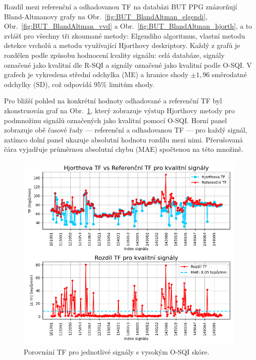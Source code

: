 Rozdíl mezi referenční a odhadovanou \acs{TF} na databázi \acs{BUT PPG} znázorňují Bland-Altmanovy grafy na Obr.~\ref{fig:BUT_BlandAltman_elgendi}, Obr.~\ref{fig:BUT_BlandAltman_vvd} a Obr.~\ref{fig:BUT_BlandAltman_hjorth}, a to zvlášť pro všechny tři zkoumané metody: Elgendiho algoritmus, vlastní metodu detekce vrcholů a metodu využívající Hjorthovy deskriptory.
Každý z grafů je rozdělen podle způsobu hodnocení kvality signálu: celá databáze, signály označené jako kvalitní dle \acs{R-SQI} a signály označené jako kvalitní podle \acs{O-SQI}.
V grafech je vykreslena střední odchylka (ME) a hranice shody $\pm1{,}96$ směrodatné odchylky (\acs{SD}), což odpovídá 95\% limitům shody.

Pro bližší pohled na konkrétní hodnoty odhadované a referenční \acs{TF} byl zkonstruován graf na Obr.~\ref{fig:BUT_hr_dif_O-SQI}, který zobrazuje výstup Hjorthovy metody pro podmnožinu signálů označených jako kvalitní pomocí \acs{O-SQI}.
Horní panel zobrazuje obě časové řady — referenční a odhadovanou \acs{TF} — pro každý signál, zatímco dolní panel ukazuje absolutní hodnotu rozdílu mezi nimi.
Přerušovaná čára vyjadřuje průměrnou absolutní chybu (\acs{MAE}) spočtenou na této množině.

\begin{figure}[!ht]
	\centering
	\includegraphics[width=1\textwidth]{./obrazky/vysledky/hjorth_hr_diff_butppg_Q-SQI.png}
	\caption[Porovnání TF pro jednotlivé kvalitní signály - BUT PPG]{Porovnání TF pro jednotlivé signály s vysokým O-SQI skóre.}
	\label{fig:BUT_hr_dif_O-SQI}
\end{figure}


